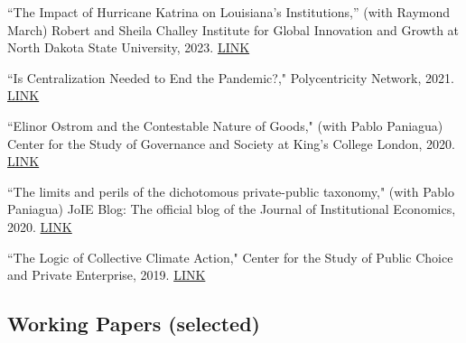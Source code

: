 \documentclass[12pt,letterpaper]{report}
\newcommand{\listitemspace}{0.15em} %
\renewenvironment{itemize}
{\begin{list}{}{\setlength{\leftmargin}{0em}
            \setlength{\parskip}{0em}
            \setlength{\itemsep}{\listitemspace}
            \setlength{\parsep}{\listitemspace}}}
{\end{list}}
\begin{document}
\begin{itemize}
\item [] ``The Impact of Hurricane Katrina on Louisiana's Institutions,'' (with Raymond March) Robert and Sheila Challey Institute for Global Innovation and Growth at North Dakota State University, 2023.  \href{https://www.ndsu.edu/fileadmin/challeyinstitute/Research_Briefs/Research_Brief_Impact_of_Hurricane_Katrina_on_Louisiana_s_Institutions.pdf}
{LINK \faExternalLink}
\item [] ``Is Centralization Needed to End the Pandemic?," Polycentricity Network, 2021.
\href{https://polycentricity.iasc-commons.org/is-centralization-needed-to-end-the-pandemic-an-essay-by-veeshan-raymajhee-ndsuusa/}
{LINK \faExternalLink}
\item [] ``Elinor Ostrom and the Contestable Nature of Goods," (with Pablo Paniagua) Center for the Study of Governance and Society at King's College London, 2020.
\href{https://csgs.kcl.ac.uk/elinor-ostrom-and-the-contestable-nature-of-goods/} {LINK \faExternalLink}
\item [] ``The limits and perils of the dichotomous private-public taxonomy," (with Pablo Paniagua) JoIE Blog: The official blog of the Journal of Institutional Economics, 2020.
\href{https://joie-blog.net/the-limits-and-perils-of-the-dichotomous-private-public-taxonomy}
{LINK \faExternalLink}
\item [] ``The Logic of Collective Climate Action," Center for the Study of Public Choice and Private Enterprise, 2019. \href{https://ndsu-pcpe.medium.com/the-logic-of-collective-climate-action-24cfcfb6014}{LINK \faExternalLink}
\end{itemize}


  \subsection*{Working Papers (selected)}
\end{document}
